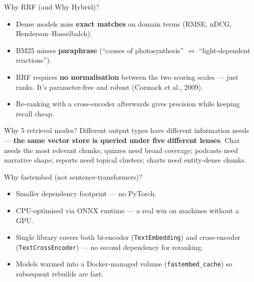 \documentclass[aspectratio=169, 10pt]{beamer}
\begin{document}
\begin{frame}{Why RRF (and Why Hybrid)?}
  \begin{itemize}
    \item Dense models miss \textbf{exact matches} on domain terms
          (RMSE, nDCG, Henderson--Hasselbalch).
    \item BM25 misses \textbf{paraphrase} (``causes of photosynthesis''
          $\not\rightarrow$ ``light-dependent reactions'').
    \item RRF requires \textbf{no normalisation} between the two scoring
          scales --- just ranks. It's parameter-free and robust
          (Cormack et al., 2009).
    \item Re-ranking with a cross-encoder afterwards gives precision
          while keeping recall cheap.
  \end{itemize}

  \begin{exampleblock}{Why 5 retrieval modes?}
    \scriptsize
    Different output types have different information needs ---
    \textbf{the same vector store is queried under five different
    lenses}. Chat needs the most relevant chunks; quizzes need broad
    coverage; podcasts need narrative shape; reports need topical
    clusters; charts need entity-dense chunks.
  \end{exampleblock}
\end{frame}

\begin{frame}{Why fastembed (not sentence-transformers)?}
  \begin{itemize}
    \item Smaller dependency footprint --- no PyTorch.
    \item CPU-optimised via ONNX runtime --- a real win on machines
          without a GPU.
    \item Single library covers both bi-encoder (\texttt{TextEmbedding})
          and cross-encoder (\texttt{TextCrossEncoder}) --- no second
          dependency for reranking.
    \item Models warmed into a Docker-managed volume (\texttt{fastembed\_cache})
          so subsequent rebuilds are fast.
  \end{itemize}
\end{frame}
\end{document}
